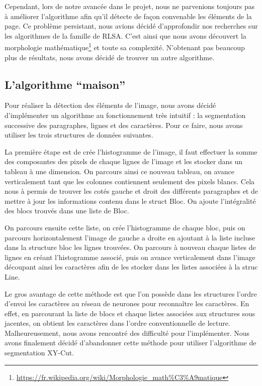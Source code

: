 \documentclass[11pt]{report}
\begin{document}
Cependant, lors de notre avancée dans le projet, nous ne parvenions toujours pas à améliorer l'algorithme afin qu'il détecte de façon convenable les éléments de la page. Ce problème persistant, nous avions décidé d'approfondir nos recherches sur les algorithmes de la famille de RLSA. C'est ainsi que nous avons découvert la morphologie mathématique\footnote{\url{https://fr.wikipedia.org/wiki/Morphologie_math\%C3\%A9matique}} et toute sa complexité. N'obtenant pas beaucoup plus de résultats, nous avons décidé de trouver un autre algorithme.

\subsection{L'algorithme ``maison''}

Pour réaliser la détection des éléments de l'image, nous avons décidé d’implémenter un algorithme au fonctionnement très intuitif : la segmentation successive des paragraphes, lignes et des caractères. Pour ce faire, nous avons utiliser les trois structures de données suivantes.

\bigskip


La première étape est de crée l'histogramme de l'image, il faut effectuer la somme des composantes des pixels de chaque lignes de l'image et les stocker dans un tableau à une dimension. On parcours ainsi ce nouveau tableau, on avance verticalement tant que les colonnes contiennent seulement des pixels blancs. Cela nous à permis de trouver les cotés gauche et droit des différents paragraphes et de mettre à jour les informations contenu dans le struct Bloc. On ajoute l'intégralité des blocs trouvés dans une liste de Bloc.

On parcours ensuite cette liste, on crée l'histogramme de chaque bloc, puis on parcours horizontalement l'image de gauche a droite en ajoutant à la liste incluse dans la structure bloc les lignes trouvées. On parcours à nouveau chaque listes de lignes en créant l'histogramme associé, puis on avance verticalement dans l'image découpant ainsi les caractères afin de les stocker dans les listes associées à la struc Line.

Le gros avantage de cette méthode est que l'on possède dans les structures l'ordre d'envoi les caractères au réseau de neurones pour reconnaître les caractères. En effet, en parcourant la liste de blocs et chaque listes associées aux structures sous jacentes, on obtient les caractères dans l'ordre conventionnelle de lecture. Malheureusement, nous avons rencontré des difficulté pour l'implémenter. Nous avons finalement décidé d'abandonner cette méthode pour utiliser l'algorithme de segmentation XY-Cut.
\end{document}
